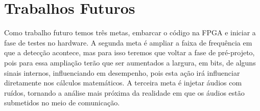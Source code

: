 \documentclass[monografia]{subfiles}
\begin{document}
		\section{Trabalhos Futuros}
			Como trabalho futuro temos três metas, embarcar o código na FPGA e iniciar a fase de testes no hardware. A segunda meta é ampliar a faixa de frequência
			em que a detecção acontece, mas para isso teremos que voltar a fase de pré-projeto, pois para essa ampliação terão que ser aumentados a largura, em bits,
			de alguns sinais internos, influenciando em desempenho, pois esta ação irá influenciar diretamente nos cálculos matemáticos. A terceira meta é injetar
			áudios com ruídos, tornando a análise mais próxima da realidade em que os áudios estão submetidos no meio de comunicação.



			
\end{document}

